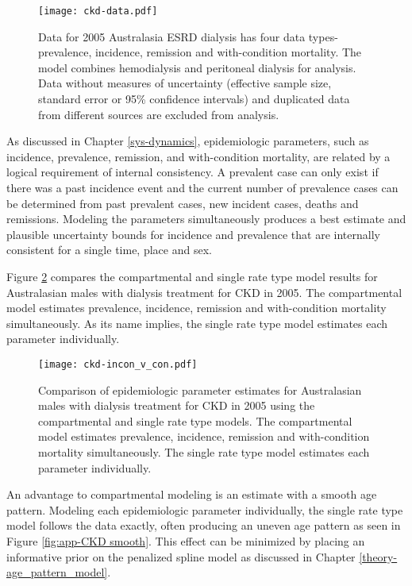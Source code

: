     \begin{figure}[h]
        \begin{center}
            \texttt{[image: ckd-data.pdf]}
            \caption{Data for 2005 Australasia ESRD dialysis has four data types-prevalence, incidence, remission and with-condition mortality.  The model combines hemodialysis and peritoneal dialysis for analysis.  Data without measures of uncertainty (effective sample size, standard error or 95\% confidence intervals) and duplicated data from different sources are excluded from analysis.}
            \label{fig:app-CKD data}
        \end{center}
    \end{figure}

As discussed in Chapter \ref{sys-dynamics}, epidemiologic parameters, such as incidence, prevalence, remission, and with-condition mortality, are related by a logical requirement of internal consistency.  A prevalent case can only exist if there was a past incidence event and the current number of prevalence cases can be determined from past prevalent cases, new incident cases, deaths and remissions.  Modeling the parameters simultaneously produces a best estimate and plausible uncertainty bounds for incidence and prevalence that are internally consistent for a single time, place and sex.

Figure \ref{fig:app-CKD incon v con} compares the compartmental and single rate type model results for Australasian males with dialysis treatment for CKD in 2005.  The compartmental model estimates prevalence, incidence, remission and with-condition mortality simultaneously.  As its name implies, the single rate type model estimates each parameter individually.

    \begin{figure}[h]
        \begin{center}
            \texttt{[image: ckd-incon\_v\_con.pdf]}
            \caption{Comparison of epidemiologic parameter estimates for Australasian males with dialysis treatment for CKD in 2005 using the compartmental and single rate type models.  The compartmental model estimates prevalence, incidence, remission and with-condition mortality simultaneously.  The single rate type model estimates each parameter individually.}
            \label{fig:app-CKD incon v con}
        \end{center}
    \end{figure}

An advantage to compartmental modeling is an estimate with a smooth age pattern. Modeling each epidemiologic parameter individually, the single rate type model follows the data exactly, often producing an uneven age pattern as seen in Figure \ref{fig:app-CKD smooth}.  This effect can be minimized by placing an informative prior on the penalized spline model as discussed in Chapter \ref{theory-age_pattern_model}.

